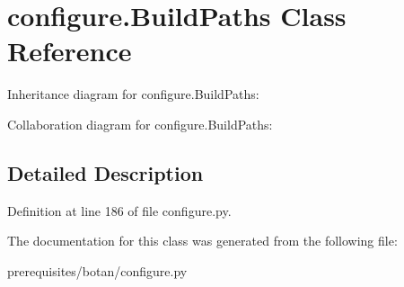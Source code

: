 \hypertarget{classconfigure_1_1_build_paths}{}\section{configure.\+Build\+Paths Class Reference}
\label{classconfigure_1_1_build_paths}


Inheritance diagram for configure.\+Build\+Paths\+:


Collaboration diagram for configure.\+Build\+Paths\+:


\subsection{Detailed Description}


Definition at line 186 of file configure.\+py.



The documentation for this class was generated from the following file\+:\begin{DoxyCompactItemize}
\item 
prerequisites/botan/configure.\+py\end{DoxyCompactItemize}
